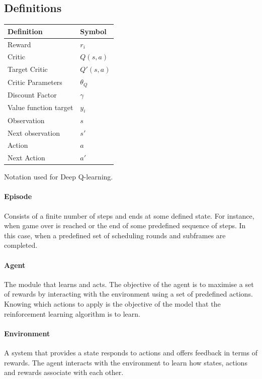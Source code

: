 \subsection{Definitions}
\begin{margintable}
    \centering
    \footnotesize{
    \begin{tabular}{l|l}
        Definition & Symbol  \\ \hline
        Reward & $r_i$ \\
        Critic & $Q(s, a)$ \\
        Target Critic & $Q'(s, a)$\\
        Critic Parameters & $\theta_Q$ \\
        Discount Factor & $\gamma$ \\
        Value function target & $y_i$ \\
        Observation & $s$ \\
        Next observation & $s'$ \\
        Action & $a$ \\
        Next Action & $a'$ \\
    \end{tabular}
    \caption{Notation used for Deep Q-learning.}
    \label{tab:deep_q_learning_symbols}
    }
\end{margintable}

\paragraph{Episode}
Consists of a finite number of steps and ends at some defined state. For instance, when game over is reached or the end of some predefined sequence of steps. In this case, when a predefined set of scheduling rounds and subframes are completed.

\paragraph{Agent}
The module that learns and acts. The objective of the agent is to maximise a set of rewards by interacting with the environment using a set of predefined actions. Knowing which actions to apply is the objective of the model that the reinforcement learning algorithm is to learn.

\paragraph{Environment}
A system that provides a state responds to actions and offers feedback in terms of rewards. The agent interacts with the environment to learn how states, actions and rewards associate with each other.

